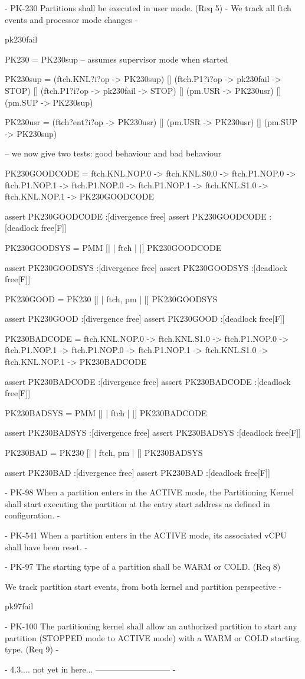 {- PK-230
Partitions shall be executed in user mode. (Req 5)
-
We track all ftch events and processor mode changes
-}
\begin{circus}
\circchannel pk230fail

PK230 = PK230sup -- assumes supervisor mode when started

PK230sup
 =  (ftch.KNL?i?op -> PK230sup)
    []
    (ftch.P1?i?op -> pk230fail -> STOP)
    []
    (ftch.P1?i?op -> pk230fail -> STOP)
    []
    (pm.USR -> PK230usr)
    []
    (pm.SUP -> PK230sup)

PK230usr
 =  (ftch?ent?i?op -> PK230usr)
    []
    (pm.USR -> PK230usr)
    []
    (pm.SUP -> PK230sup)

-- we now give two tests: good behaviour and bad behaviour

PK230GOODCODE
 = ftch.KNL.NOP.0 -> ftch.KNL.S0.0 ->
   ftch.P1.NOP.0 -> ftch.P1.NOP.1 ->
   ftch.P1.NOP.0 -> ftch.P1.NOP.1 ->
   ftch.KNL.S1.0 -> ftch.KNL.NOP.1 -> PK230GOODCODE

assert PK230GOODCODE :[divergence free]
assert PK230GOODCODE :[deadlock free[F]]

PK230GOODSYS = PMM [| {| ftch |} |] PK230GOODCODE

assert PK230GOODSYS :[divergence free]
assert PK230GOODSYS :[deadlock free[F]]

PK230GOOD = PK230 [| {| ftch, pm |} |] PK230GOODSYS

assert PK230GOOD :[divergence free]
assert PK230GOOD :[deadlock free[F]]

PK230BADCODE
 = ftch.KNL.NOP.0 -> ftch.KNL.S1.0 ->
   ftch.P1.NOP.0 -> ftch.P1.NOP.1 ->
   ftch.P1.NOP.0 -> ftch.P1.NOP.1 ->
   ftch.KNL.S1.0 -> ftch.KNL.NOP.1 -> PK230BADCODE

assert PK230BADCODE :[divergence free]
assert PK230BADCODE :[deadlock free[F]]

PK230BADSYS = PMM [| {| ftch |} |] PK230BADCODE

assert PK230BADSYS :[divergence free]
assert PK230BADSYS :[deadlock free[F]]

PK230BAD = PK230 [| {| ftch, pm |} |] PK230BADSYS

assert PK230BAD :[divergence free]
assert PK230BAD :[deadlock free[F]]
\end{circus}
{- PK-98
When a partition enters in the ACTIVE mode, the Partitioning Kernel shall start executing the partition at the entry start address as defined in configuration.
-}

{- PK-541
When a partition enters in the ACTIVE mode,  its associated vCPU shall have been reset.
-}

{- PK-97
The starting type of a partition shall be WARM or COLD. (Req 8)

We track partition start events, from both kernel and partition perspective
-}
\begin{circus}
\circchannel pk97fail
\end{circus}


{- PK-100
The partitioning kernel shall allow an authorized partition to start any partition (STOPPED mode to ACTIVE mode)  with a WARM or COLD starting type. (Req 9)
-}

{- 4.3.... not yet in here... --------------------------- -}
